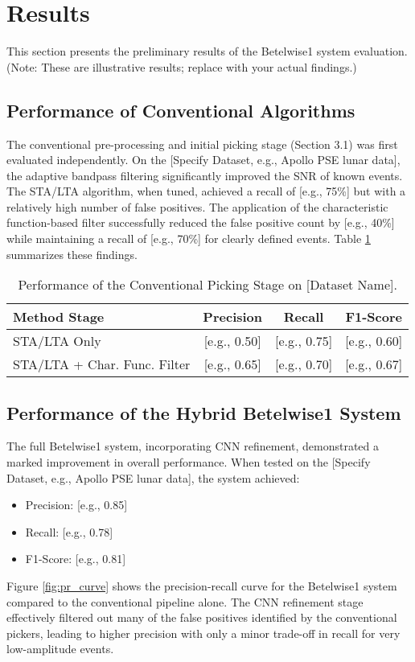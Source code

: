 \documentclass[11pt,a4paper]{article}
\begin{document}
\section{Results}
This section presents the preliminary results of the Betelwise1 system evaluation. (Note: These are illustrative results; replace with your actual findings.)

\subsection{Performance of Conventional Algorithms}
The conventional pre-processing and initial picking stage (Section 3.1) was first evaluated independently. On the [Specify Dataset, e.g., Apollo PSE lunar data], the adaptive bandpass filtering significantly improved the SNR of known events. The STA/LTA algorithm, when tuned, achieved a recall of [e.g., 75\%] but with a relatively high number of false positives. The application of the characteristic function-based filter successfully reduced the false positive count by [e.g., 40\%] while maintaining a recall of [e.g., 70\%] for clearly defined events. Table \ref{tab:conventional_results} summarizes these findings.

\begin{table}[H]
    \centering
    \caption{Performance of the Conventional Picking Stage on [Dataset Name].}
    \label{tab:conventional_results}
    \begin{tabular}{@{}lccc@{}}
        \toprule
        Method Stage                  & Precision & Recall & F1-Score \\ \midrule
        STA/LTA Only                  & [e.g., 0.50]   & [e.g., 0.75]  & [e.g., 0.60]  \\
        STA/LTA + Char. Func. Filter & [e.g., 0.65]   & [e.g., 0.70]  & [e.g., 0.67]  \\ \bottomrule
    \end{tabular}
\end{table}

\subsection{Performance of the Hybrid Betelwise1 System}
The full Betelwise1 system, incorporating CNN refinement, demonstrated a marked improvement in overall performance. When tested on the [Specify Dataset, e.g., Apollo PSE lunar data], the system achieved:
\begin{itemize}
    \item Precision: [e.g., 0.85]
    \item Recall: [e.g., 0.78]
    \item F1-Score: [e.g., 0.81]
\end{itemize}
Figure \ref{fig:pr_curve} shows the precision-recall curve for the Betelwise1 system compared to the conventional pipeline alone. The CNN refinement stage effectively filtered out many of the false positives identified by the conventional pickers, leading to higher precision with only a minor trade-off in recall for very low-amplitude events.
\end{document}
